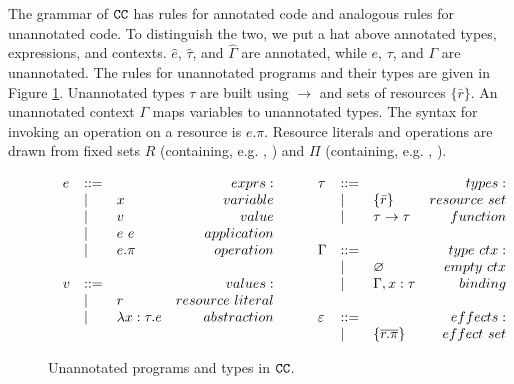 The grammar of $\mathtt{CC}$ has rules for annotated code and
analogous rules for unannotated code. To distinguish the two, we put a
hat above annotated types, expressions, and contexts. $\hat e$,
$\hat \tau$, and $\hat \Gamma$ are annotated, while $e$, $\tau$, and
$\Gamma$ are unannotated. The rules for unannotated programs and their
types are given in Figure
\ref{fig:epscalc_unannotated_grammar}. Unannotated types $\tau$ are
built using $\rightarrow$ and sets of resources $\{ \bar r \}$. An
unannotated context $\Gamma$ maps variables to unannotated types.
The syntax for invoking an operation on a resource is $e.\pi$. Resource
literals and operations are drawn from fixed sets $R$ (containing, e.g.
, ) and $\Pi$ (containing, e.g. ,
).

\begin{figure}[htb]
\vspace*{-5mm}
\[
\begin{array}{lll}
\begin{array}{lllr}
e & ::= & ~ & exprs: \\
	& | & x & variable \\
	& | & v & value \\
	& | & e ~ e & application \\
	& | & e.\pi & operation \\
	&&\\

v & ::= & ~ & values: \\
	& | & r & resource~literal \\
	& | & \lambda x: \tau.e & abstraction \\
&&\\
\end{array}
\hspace{5ex}
\begin{array}{lllr}
\tau & ::= & ~ & types: \\
		& | & \{ \bar r \} & resource~set \\
		& | & \tau \rightarrow \tau & function\\ 
		&&\\

\Gamma & ::= & ~ & type~ctx: \\
				& | & \varnothing & empty~ctx\\
				& | & \Gamma, x: \tau & binding\\
				&&\\
				
\varepsilon & ::= & ~ & effects: \\
		& | & \{ \overline{r.\pi} \} & effect~set
\end{array}
\end{array}
\]
\vspace*{-5mm}
\caption{Unannotated programs and types in $\mathtt{CC}$.}
\vspace*{-5mm}
\label{fig:epscalc_unannotated_grammar}
\end{figure}

